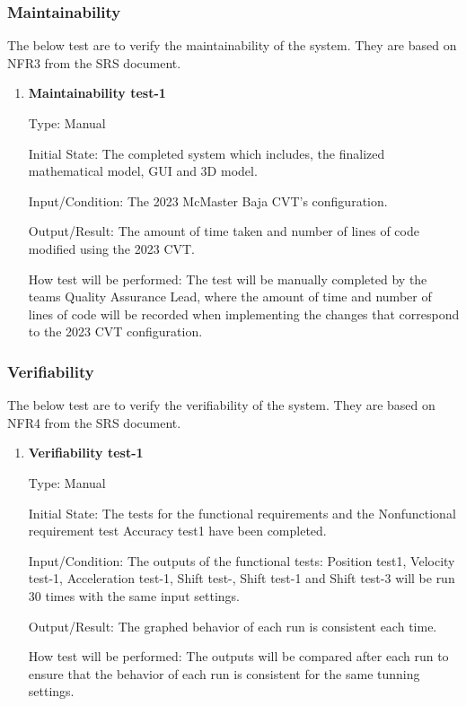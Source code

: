 \documentclass[12pt, titlepage]{article}
\begin{document}
\subsubsection{Maintainability}

The below test are to verify the maintainability of the system.
They are based on NFR3 from the SRS document.

\begin{enumerate}

  \item {} \hypertarget{Maintainability test-1}{\textbf{Maintainability test-1}} \label{Maintainability test-1}

Type: Manual
					
Initial State: The completed system which includes, the finalized mathematical model, GUI and 3D model.  
					
Input/Condition: The 2023 McMaster Baja CVT's configuration. 
					
Output/Result: The amount of time taken and number of lines of code modified using the 2023 CVT.
					
How test will be performed: The test will be manually completed by the teams Quality Assurance Lead, where the amount of time and number of lines of code will be recorded when implementing the changes that correspond to the 2023 CVT configuration.

\end{enumerate}

\subsubsection{Verifiability}

The below test are to verify the verifiability of the system.
They are based on NFR4 from the SRS document.

\begin{enumerate}

  \item {} \hypertarget{Verifiability test-1}{\textbf{Verifiability test-1}} \label{Verifiability test-1}

Type: Manual
					
Initial State: The tests for the functional requirements and the Nonfunctional requirement test Accuracy test1 have been completed.
					
Input/Condition: The outputs of the functional tests: Position test1, Velocity test-1, Acceleration test-1, Shift test-, Shift test-1 and Shift test-3 will be run 30 times with the same input settings. 
					
Output/Result: The graphed behavior of each run is consistent each time.
					
How test will be performed: The outputs will be compared after each run to ensure that the behavior of each run is consistent for the same tunning settings.

\end{enumerate}
\end{document}
